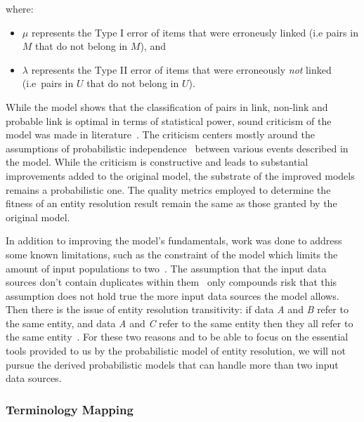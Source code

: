 where:

\begin{itemize}
    \item $\mu$ represents the Type I error of items that were erroneusly
    linked (i.e pairs in $M$ that do not belong in $M$), and
    \item $\lambda$ represents the Type II error of items that were
    erroneously \textit{not} linked (i.e~pairs in $U$ that do not belong in
    $U$).
\end{itemize}

While the model shows that the classification of pairs in link, non-link and
probable link is optimal in terms of statistical power, sound criticism of the
model was made in literature~\cite{tancredi2011fsmcrit}.
The criticism centers mostly around the assumptions of probabilistic
independence~\cite{winkler2014matching,tancredi2011fsmcrit} between various
events described in the model.
While the criticism is constructive and leads to substantial improvements added
to the original model, the substrate of the improved models remains a
probabilistic one.
The quality metrics employed to determine the fitness of an entity resolution
result remain the same as those granted by the original model.

In addition to improving the model's fundamentals, work was done to address some
known limitations, such as the constraint of the model which limits the amount
of input populations to two~\cite{sad2013genfsm,Kon19}.
The assumption that the input data sources don't contain duplicates within
them~\cite{fs1969,sad2014fsmdup} only compounds risk that this assumption does
not hold true the more input data sources the model allows.
Then there is the issue of entity resolution transitivity: if data \textit{A}
and \textit{B} refer to the same entity, and data \textit{A} and \textit{C}
refer to the same entity then they all refer to the same entity~\cite{Tal11}.
For these two reasons and to be able to focus on the essential tools provided to
us by the probabilistic model of entity resolution, we will not pursue the
derived probabilistic models that can handle more than two input data sources. 

\subsubsection[fms-term]{Terminology Mapping}\label{subsubsec:fsm-term}

